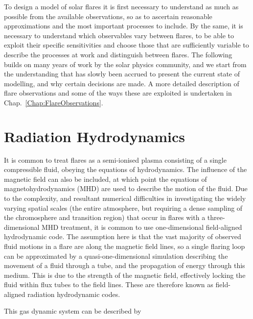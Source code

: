 To design a model of solar flares it is first necessary to understand as much as possible from the available observations, so as to ascertain reasonable approximations and the most important processes to include.
By the same, it is necessary to understand which observables vary between flares, to be able to exploit their specific sensitivities and choose those that are sufficiently variable to describe the processes at work and distinguish between flares.
The following builds on many years of work by the solar physics community, and we start from the understanding that has slowly been accrued to present the current state of modelling, and why certain decisions are made.
A more detailed description of flare observations and some of the ways these are exploited is undertaken in Chap.~\ref{Chap:FlareObservations}.

\section{Radiation Hydrodynamics}


It is common to treat flares as a semi-ionised plasma consisting of a single compressible fluid, obeying the equations of hydrodynamics. The influence of the magnetic field can also be included, at which point the equations of magnetohydrodynamics (MHD) are used to describe the motion of the fluid.
Due to the complexity, and resultant numerical difficulties in investigating the widely varying spatial scales (the entire atmosphere, but requiring a dense sampling of the chromosphere and transition region) that occur in flares with a three-dimensional MHD treatment, it is common to use one-dimensional field-aligned hydrodynamic code.
The assumption here is that the vast majority of observed fluid motions in a flare are along the magnetic field lines, so a single flaring loop can be approximated by a quasi-one-dimensional simulation describing the movement of a fluid through a tube, and the propagation of energy through this medium.
This is due to the strength of the magnetic field, effectively locking the fluid within flux tubes to the field lines.
These are therefore known as field-aligned radiation hydrodynamic codes.

This gas dynamic system can be described by

